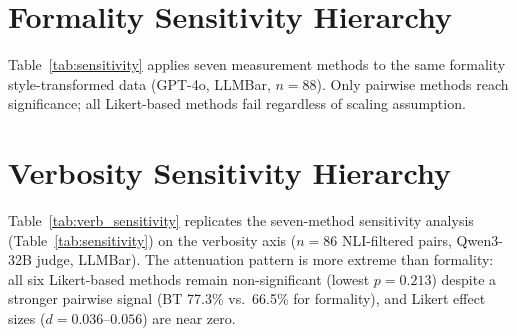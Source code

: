 \section{Formality Sensitivity Hierarchy}
\label{app:sensitivity}

Table~\ref{tab:sensitivity} applies seven measurement methods to the same formality style-transformed data (GPT-4o, LLMBar, $n = 88$).
Only pairwise methods reach significance; all Likert-based methods fail regardless of scaling assumption.

\begin{table}[h]
\centering
\small
\caption{Sensitivity hierarchy: seven measurement methods applied to the same formality data. Only pairwise methods (top two rows) reach significance.}
\label{tab:sensitivity}
\end{table}

\section{Verbosity Sensitivity Hierarchy}
\label{app:verb_sensitivity}

Table~\ref{tab:verb_sensitivity} replicates the seven-method sensitivity analysis (Table~\ref{tab:sensitivity}) on the verbosity axis ($n = 86$ NLI-filtered pairs, Qwen3-32B judge, LLMBar).
The attenuation pattern is more extreme than formality: all six Likert-based methods remain non-significant (lowest $p = 0.213$) despite a stronger pairwise signal (BT 77.3\% vs.\ 66.5\% for formality), and Likert effect sizes ($d = 0.036$--$0.056$) are near zero.

